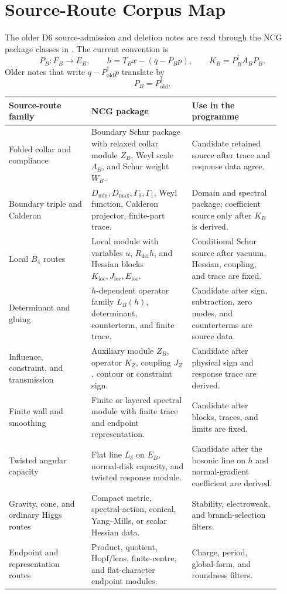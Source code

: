 \documentclass[11pt]{article}
\begin{document}
\section{Source-Route Corpus Map}

The older D6 source-admission and deletion notes are read through the NCG
package classes in \cite{ncg-source-audit-corpus}.  The current convention is
\[
  P_B:F_B\to E_B,\qquad
  h=T_Bx-(q-P_Bp),\qquad
  K_B=P_B^\dagger A_BP_B .
\]
Older notes that write \(q-P_{\mathrm{old}}^\dagger p\) translate by
\[
  P_B=P_{\mathrm{old}}^\dagger .
\]

\begin{center}
\small
\begin{tabular}{@{}L{0.28\linewidth}L{0.34\linewidth}L{0.30\linewidth}@{}}
\toprule
Source-route family & NCG package & Use in the programme \\
\midrule
Folded collar and compliance
  & Boundary Schur package with relaxed collar module \(Z_B\), Weyl scale
    \(\Lambda_B\), and Schur weight \(W_B\).
  & Candidate retained source after trace and response data agree. \\
Boundary triple and Calderon
  & \(D_{\min},D_{\max},\Gamma_0,\Gamma_1\), Weyl function, Calderon
    projector, finite-part trace.
  & Domain and spectral package; coefficient source only after \(K_B\) is derived. \\
Local \(B_4\) routes
  & Local module with variables \(u\), \(R_{\mathrm{def}}h\), and Hessian
    blocks \(K_{\mathrm{loc}},J_{\mathrm{loc}},E_{\mathrm{loc}}\).
  & Conditional Schur source after vacuum, Hessian, coupling, and trace are fixed. \\
Determinant and gluing
  & \(h\)-dependent operator family \(L_B(h)\), determinant, counterterm,
    and finite trace.
  & Candidate after sign, subtraction, zero modes, and counterterms are source data. \\
Influence, constraint, and transmission
  & Auxiliary module \(Z_B\), operator \(K_Z\), coupling \(J_Z\), contour or
    constraint sign.
  & Candidate after physical sign and response trace are derived. \\
Finite wall and smoothing
  & Finite or layered spectral module with finite trace and endpoint
    representation.
  & Candidate after blocks, traces, and limits are fixed. \\
Twisted angular capacity
  & Flat line \(L_\delta\) on \(E_B\), normal-disk capacity, and twisted
    response module.
  & Candidate after the bosonic line on \(h\) and normal-gradient coefficient are derived. \\
Gravity, cone, and ordinary Higgs routes
  & Compact metric, spectral-action, conical, Yang--Mills, or scalar
    Hessian data.
  & Stability, electroweak, and branch-selection filters. \\
Endpoint and representation routes
  & Product, quotient, Hopf/lens, finite-centre, and flat-character endpoint
    modules.
  & Charge, period, global-form, and roundness filters. \\
\bottomrule
\end{tabular}
\end{center}
\end{document}
